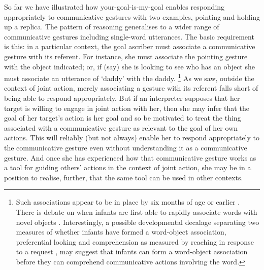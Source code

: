 \documentclass[14pt,a4paper]{extarticle}
\begin{document}
So far we have illustrated how your-goal-is-my-goal enables responding appropriately to communicative gestures with two examples, pointing and holding up a replica.
The pattern of reasoning generalises to a wider range of communicative gestures including single-word utterances.
The basic requirement is this: in a particular context, the goal ascriber must associate a communicative gesture with its referent.
For instance, she must associate the pointing gesture with the object indicated; or, if (say) she is looking to see who has an object she must associate an utterance of `daddy' with the daddy.%
\footnote{
Such associations appear to be in place by six months of age or earlier \citep{tincoff:1999_beginnings_,tincoff:2011}.
There is debate on when infants are first able to rapidly associate words with novel objects \citep{werker:1998_acquisition,friedrich:2011_word_}.
Interestingly,
a possible developmental decalage separating 
two measures of whether infants have formed a word-object association,
preferential looking and comprehension as measured by reaching in response to a request  \citep{gurteen:2011_rapid},
may suggest that
infants can form a word-object association before they can comprehend communicative actions involving the word.
}
As we saw, 
outside the context of joint action,
merely associating a gesture with its referent falls short of being able to respond appropriately.
But if an interpreter supposes that her target is willing to engage in joint action with her,
then she may infer that the goal of her target's action is her goal
and so be motivated to treat the thing associated with a communicative gesture as relevant to the goal of her own actions.
This will reliably (but not always) enable her to respond appropriately to the communicative gesture even without understanding it as a communicative gesture.
And once she has experienced how that communicative gesture works as a tool for guiding others' actions in the context of joint action,
she may be in a position to realise, further, that the same tool can be used in other contexts.
\end{document}
